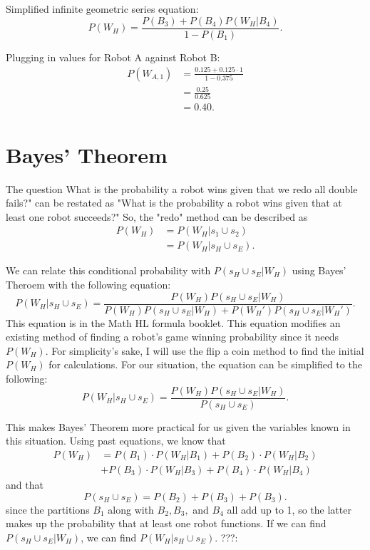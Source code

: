 \documentclass[11pt]{article}
\begin{document}
Simplified infinite geometric series equation:
\begin{equation*}
    P(W_{H}) = \frac{P(B_3) + P(B_4)P(W_H | B_4)}{1-P(B_1)}.
\end{equation*}

Plugging in values for Robot A against Robot B:
\begin{align*}
    P(W_{A,1}) &= \frac{0.125 + 0.125 \cdot 1}{1-0.375}\\
    &=\frac{0.25}{0.625}\\
    &=0.40.
\end{align*}


\section{Bayes' Theorem}
The question What is the probability a robot wins given that we redo all double fails?" can be restated as
"What is the probability a robot wins given that at least one robot succeeds?" So, the "redo" method can be
described as 
\begin{align*}
    P(W_H) &= P(W_H | s_1 \cup s_2)\\
    &= P(W_H | s_H \cup s_E).
\end{align*}

We can relate this conditional probability with \(P(s_H \cup s_E | W_H) \) using Bayes' Theroem with the following
equation:
\begin{equation*}
    P(W_H | s_H \cup s_E) = \frac{P(W_H) P(s_H \cup s_E | W_H)}{P(W_H) P(s_H \cup s_E | W_H) + P(W_H') P(s_H \cup s_E | W_H')}.
\end{equation*}
This equation is in the Math HL formula booklet. This equation modifies an existing method of finding
a robot's game winning probability since it needs \(P(W_H)\). For simplicity's sake, I will use the flip
a coin method to find the initial \(P(W_H)\) for calculations. For our situation, the equation can be 
simplified to the following:
\begin{equation*}
    P(W_H | s_H \cup s_E) = \frac{P(W_H) P(s_H \cup s_E | W_H)}{P(s_H \cup s_E)}.
\end{equation*}

This makes  Bayes' Theorem more practical for us given the variables known in this situation. Using past 
equations, we know that
\begin{align*}
    P(W_H) &=  P(B_{1}) \cdot P(W_{H} | B_{1}) + P(B_{2}) \cdot P(W_{H} | B_{2}) \\
    &+ P(B_{3}) \cdot P(W_{H} | B_{3}) + P(B_{4}) \cdot P(W_{H} | B_{4})
\end{align*}
and that
\begin{equation*}
    P(s_H \cup s_E) = P(B_2) + P(B_3) + P(B_3).
\end{equation*}
since the partitions \(B_1\) along with \(B_2, B_3,\) and \(B_4\) all add up to 1, so the latter makes up the probability that at least
one robot functions. If we can find \(P(s_H \cup s_E | W_H)\), we can find \(P(W_H | s_H \cup s_E)\). ???:
\end{document}
